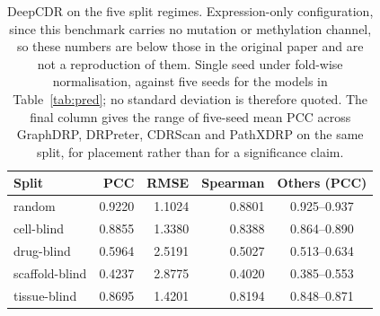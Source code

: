 \begin{table}[!ht]
\centering\small
\caption{DeepCDR on the five split regimes. Expression-only configuration, since this benchmark carries no mutation or methylation channel, so these numbers are below those in the original paper and are not a reproduction of them. Single seed under fold-wise normalisation, against five seeds for the models in Table~\ref{tab:pred}; no standard deviation is therefore quoted. The final column gives the range of five-seed mean PCC across GraphDRP, DRPreter, CDRScan and PathXDRP on the same split, for placement rather than for a significance claim.}
\label{tab:deepcdr}
\begin{tabular*}{\columnwidth}{@{\extracolsep{\fill}}lrrrc@{}}
\toprule
\textbf{Split} & \textbf{PCC} & \textbf{RMSE} & \textbf{Spearman} & \textbf{Others (PCC)} \\
\midrule
random & 0.9220 & 1.1024 & 0.8801 & 0.925--0.937 \\
cell-blind & 0.8855 & 1.3380 & 0.8388 & 0.864--0.890 \\
drug-blind & 0.5964 & 2.5191 & 0.5027 & 0.513--0.634 \\
scaffold-blind & 0.4237 & 2.8775 & 0.4020 & 0.385--0.553 \\
tissue-blind & 0.8695 & 1.4201 & 0.8194 & 0.848--0.871 \\
\bottomrule
\end{tabular*}
\end{table}

